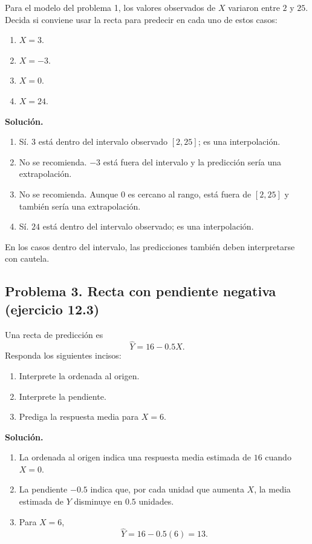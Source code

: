 Para el modelo del problema 1, los valores observados de $X$ variaron entre $2$ y $25$. Decida si conviene usar la recta para predecir en cada uno de estos casos:
\begin{enumerate}
    \item[\textbf{a)}] $X=3$.
    \item[\textbf{b)}] $X=-3$.
    \item[\textbf{c)}] $X=0$.
    \item[\textbf{d)}] $X=24$.
\end{enumerate}

\textbf{Solución.}
\begin{enumerate}
    \item[\textbf{a)}] Sí. $3$ está dentro del intervalo observado $[2,25]$; es una interpolación.
    \item[\textbf{b)}] No se recomienda. $-3$ está fuera del intervalo y la predicción sería una extrapolación.
    \item[\textbf{c)}] No se recomienda. Aunque $0$ es cercano al rango, está fuera de $[2,25]$ y también sería una extrapolación.
    \item[\textbf{d)}] Sí. $24$ está dentro del intervalo observado; es una interpolación.
\end{enumerate}
En los casos dentro del intervalo, las predicciones también deben interpretarse con cautela.

\subsection{Problema 3. Recta con pendiente negativa (ejercicio 12.3)}

Una recta de predicción es
\[
\widehat Y=16-0.5X.
\]
Responda los siguientes incisos:
\begin{enumerate}
    \item[\textbf{a)}] Interprete la ordenada al origen.
    \item[\textbf{b)}] Interprete la pendiente.
    \item[\textbf{c)}] Prediga la respuesta media para $X=6$.
\end{enumerate}

\textbf{Solución.}
\begin{enumerate}
    \item[\textbf{a)}] La ordenada al origen indica una respuesta media estimada de $16$ cuando $X=0$.
    \item[\textbf{b)}] La pendiente $-0.5$ indica que, por cada unidad que aumenta $X$, la media estimada de $Y$ disminuye en $0.5$ unidades.
    \item[\textbf{c)}] Para $X=6$,
    \[
    \widehat Y=16-0.5(6)=13.
    \]
\end{enumerate}

